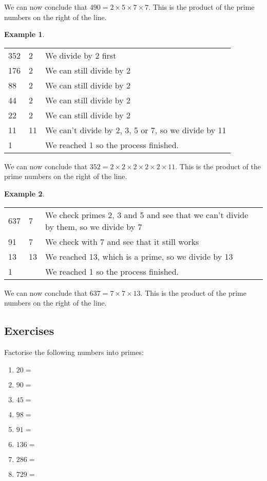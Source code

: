 \documentclass[11pt, oneside]{article}
\theoremstyle{definition}
\newtheorem{exmp}{Example}[section]
\begin{document}
We can now conclude that $490 = 2\times 5\times 7\times 7$. This is the product of the prime numbers on the right of the line.

\begin{exmp} \end{exmp}
\begin{tabular}{ p{0.5cm} | p{1.5cm}  p{10cm}}
352 & 2 & We divide by 2 first \\
176 & 2 & We can still divide by 2  \\
88 & 2 & We can still divide by 2 \\
44 & 2 & We can still divide by 2 \\
22 & 2 & We can still divide by 2 \\
11 & 11 & We can't divide by 2, 3, 5 or 7, so we divide by 11 \\
1 &  & We reached 1 so the process finished.
\end{tabular}

We can now conclude that $352 = 2\times 2\times 2\times 2\times 2\times 11$. This is the product of the prime numbers on the right of the line.

\begin{exmp} \end{exmp}
\begin{tabular}{ p{0.5cm} | p{1.5cm}  p{14cm}}
637 & 7 & We check primes 2, 3 and 5 and see that we can't divide by them, so we divide by 7 \\
91 & 7 & We check with 7 and see that it still works \\
13 & 13 & We reached 13, which is a prime, so we divide by 13 \\
1 &  & We reached 1 so the process finished.
\end{tabular}

We can now conclude that $637 = 7\times 7\times 13$. This is the product of the prime numbers on the right of the line.

\subsection{Exercises}
Factorise the following numbers into primes:
\begin{enumerate}
\item $20 = $
\item $90 = $
\item $45 =$
\item $98 =$
\item $91 =$
\item $136 =$
\item $286 =$
\item $729 =$
\end{enumerate}
\end{document}
